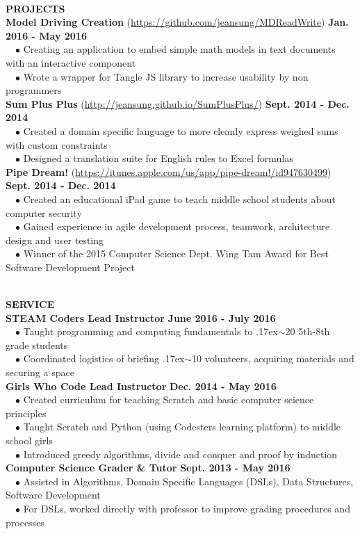 \documentclass[11pt]{article}
\newcommand{\tildeText}{\raise.17ex\hbox{$\scriptstyle\sim$}}
\newcommand{\wrapTitle}[1]{{\textbf{\sectionNL \Large #1}} \sectionNL}
\newcommand{\sectionNL}{~\\[0.5pt]}
\newcommand{\customtab}{$\hspace{10pt} \bullet \hspace{2pt}$}
\newcommand{\rightAlign}{\hfill}
\begin{document}
\begin{flushleft}
\wrapTitle{PROJECTS}
\textbf{Model Driving Creation} (\url{https://github.com/jeansung/MDReadWrite}) \rightAlign \textbf{Jan. 2016 - May 2016} \\
\customtab Creating an application to embed simple math models in text documents with an interactive component \\
\customtab Wrote a wrapper for Tangle JS library to increase usability by non programmers \\

\textbf{Sum Plus Plus} (\url{http://jeansung.github.io/SumPlusPlus/}) \rightAlign \textbf{Sept. 2014 - Dec. 2014} \\
\customtab Created a domain specific language to more cleanly express weighed sums with custom constraints \\
\customtab Designed a translation suite for English rules to Excel formulas \\

\textbf{Pipe Dream!} (\url{https://itunes.apple.com/us/app/pipe-dream!/id947630499})  \rightAlign \textbf{Sept. 2014 - Dec. 2014} \\
\customtab Created an educational iPad game to teach middle school students about computer security\\
\customtab Gained experience in agile development process, teamwork, architecture design and user testing \\
\customtab Winner of the 2015 Computer Science Dept. Wing Tam Award for Best Software Development Project 
\end{flushleft}


\begin{flushleft}
\wrapTitle{SERVICE}
\textbf{STEAM Coders Lead Instructor} \rightAlign \textbf{June 2016 - July 2016} \\
\customtab Taught programming and computing fundamentals to \tildeText20 5th-8th grade students  \\
\customtab Coordinated logistics of briefing \tildeText10 volunteers, acquiring materials and securing a space \\
\textbf{Girls Who Code Lead Instructor} \rightAlign \textbf{Dec. 2014 - May 2016} \\
\customtab Created curriculum for teaching Scratch and basic computer science principles \\
\customtab Taught Scratch and Python (using Codesters learning platform) to middle school girls \\
\customtab Introduced greedy algorithms, divide and conquer and proof by induction\\
\textbf{Computer Science Grader \& Tutor} \rightAlign \textbf{Sept. 2013 - May 2016} \\
\customtab Assisted in Algorithms, Domain Specific Languages (DSLs), Data Structures, Software Development   \\
\customtab For DSLs, worked directly with professor to improve grading procedures and processes\
\end{flushleft}
\end{document}
